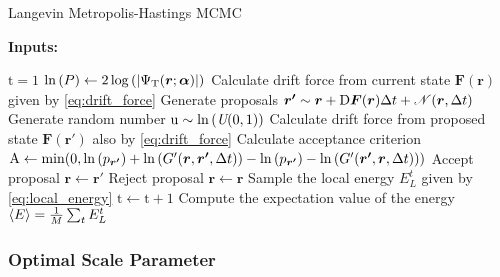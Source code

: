 \begin{algorithm}
\caption{Langevin Metropolis-Hastings MCMC}\label{algo:lmh}
\hspace*{\algorithmicindent} \textbf{Inputs: }
\begin{algorithmic}[1]
\State $\mathrm{t}=1$
\State $\ln{\qty(P)}\gets 2\log{\qty(\abs{\Psi_{\mathrm{T}}(\bm{r};\bm{\alpha})})}$ 
\Repeat 
    \State Calculate drift force from current state $\bm{F}(\bm{r})$ given by \autoref{eq:drift_force}
    \State Generate proposals $\bm{r'}\sim\bm{r}+\mathrm{D}\bm{F}(\bm{r})\Delta t + \mathcal{N}\qty(\bm{r},\Delta t)$
    \State Generate random number $\mathrm{u}\sim\ln{\qty(\textit{U}(0, 1))}$
    \State Calculate drift force from proposed state $\bm{F}(\bm{r'})$ also by \autoref{eq:drift_force}
    \State Calculate acceptance criterion
    \State $\mathrm{A}\gets\mathrm{min}\qty(0, \ln{\qty(p_{\bm{r'}})} + \ln{\qty(G'\qty(\bm{r}, \bm{r'}, \Delta t))} - \ln{\qty(p_{\bm{r'}})}-\ln{\qty(G'\qty(\bm{r'}, \bm{r}, \Delta t))})$
        \State Accept proposal $\bm{r}\gets\bm{r'}$
    \Else
        \State Reject proposal $\bm{r}\gets\bm{r}$
    \EndIf
    \State Sample the local energy $E^t_L$ given by \autoref{eq:local_energy}
    \State $\mathrm{t}\gets\mathrm{t}+1$
\State Compute the expectation value of the energy $\expval{E}=\frac{1}{M}\sum_t E^t_L$
\end{algorithmic}
\end{algorithm}

\subsubsection{Optimal Scale Parameter}\label{sec:tuning}



